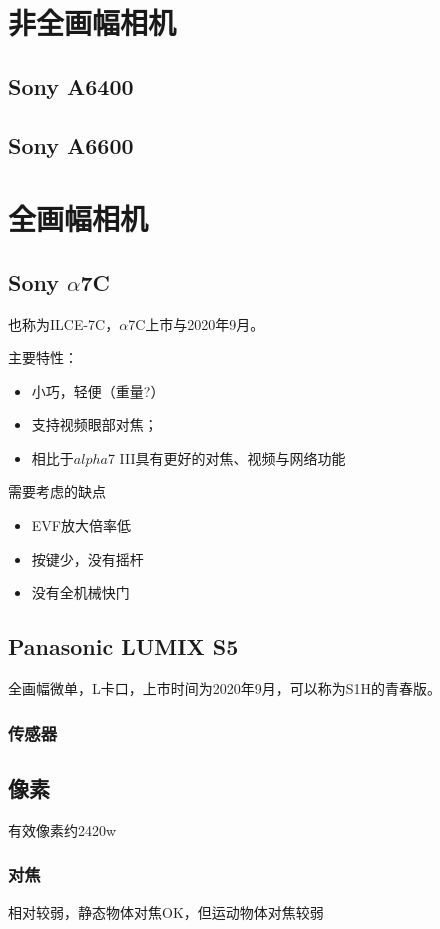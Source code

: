\documentclass{ctexart}
\begin{document}
\section{非全画幅相机}
\subsection{Sony A6400}
\subsection{Sony A6600}

\section{全画幅相机}

\subsection{Sony $\alpha$7C}
也称为ILCE-7C，$\alpha$7C上市与2020年9月。

主要特性：
\begin{itemize}
    \item 小巧，轻便（重量?）
    \item 支持视频眼部对焦；
    \item 相比于$alpha$7 III具有更好的对焦、视频与网络功能
\end{itemize}
需要考虑的缺点
\begin{itemize}
    \item EVF放大倍率低
    \item 按键少，没有摇杆
    \item 没有全机械快门
\end{itemize}

\subsection{Panasonic LUMIX S5~\cite{panasonic_lumix_s5} }
全画幅微单，L卡口，上市时间为2020年9月，可以称为S1H的青春版。
\subsubsection{传感器}
\subsection{像素}
有效像素约2420w
\subsubsection{对焦}
相对较弱，静态物体对焦OK，但运动物体对焦较弱
\end{document}
